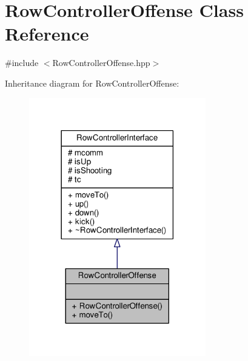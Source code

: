 \hypertarget{class_row_controller_offense}{}\section{Row\+Controller\+Offense Class Reference}
\label{class_row_controller_offense}


{\ttfamily \#include $<$Row\+Controller\+Offense.\+hpp$>$}



Inheritance diagram for Row\+Controller\+Offense\+:\nopagebreak
\begin{figure}[H]
\begin{center}
\leavevmode
\includegraphics[width=218pt]{class_row_controller_offense__inherit__graph}
\end{center}
\end{figure}


